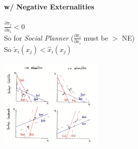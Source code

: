 \documentclass[11pt, english]{article}
\begin{document}
		\paragraph{w/ Negative Externalities}
	
	$\frac{\partial \pi_j}{\partial x_i}<0$\\           
        So for \textit{Social Planner} ($\frac{\partial \pi_i}{\partial x_i}$ must be $>$ NE)\\
        So ${\widetilde{x}}_i\left(x_j\right)<{\hat{x}}_i\left(x_j\right)$

	\begin{center}
		\includegraphics[width=5cm,height=4.5cm]{EC315-IMG/21.png}
	\end{center}
	
\end{document}

